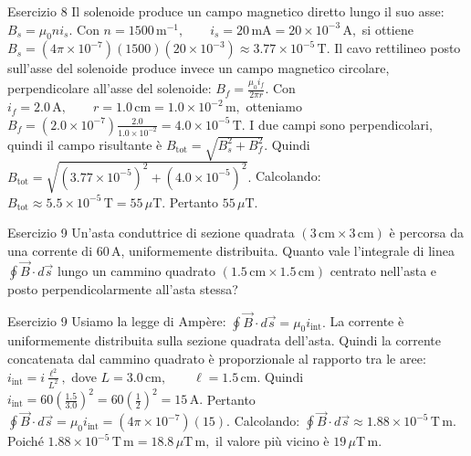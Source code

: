 \documentclass[a4paper]{article}
\begin{document}
\begin{snippetsolution}{Esercizio 8}
    Il solenoide produce un campo magnetico diretto lungo il suo asse:
    \(B_s = \mu_0 n i_s.\)
    Con
    \(n = 1500\,\mathrm{m^{-1}}, \qquad i_s = 20\,\mathrm{mA} = 20 \times 10^{-3}\,\mathrm{A},\)
    si ottiene
    \(B_s = \left(4\pi \times 10^{-7}\right) (1500) \left(20 \times 10^{-3}\right) \approx 3.77 \times 10^{-5}\,\mathrm{T}.\)
    Il cavo rettilineo posto sull'asse del solenoide produce invece un campo
    magnetico circolare, perpendicolare all'asse del solenoide:
    \(B_f = \frac{\mu_0 i_f}{2\pi r}.\)
    Con
    \(i_f = 2.0\,\mathrm{A}, \qquad r = 1.0\,\mathrm{cm} = 1.0 \times 10^{-2}\,\mathrm{m},\)
    otteniamo
    \(B_f = \left(2.0 \times 10^{-7}\right) \frac{2.0}{1.0 \times 10^{-2}} = 4.0 \times 10^{-5}\,\mathrm{T}.\)
    I due campi sono perpendicolari, quindi il campo risultante è
    \(B_{\mathrm{tot}} = \sqrt{B_s^2+B_f^2}.\)
    Quindi
    \(B_{\mathrm{tot}} = \sqrt{ \left(3.77 \times 10^{-5}\right)^2 + \left(4.0 \times 10^{-5}\right)^2 }.\)
    Calcolando:
    \(B_{\mathrm{tot}} \approx 5.5 \times 10^{-5}\,\mathrm{T} = 55\,\mu\mathrm{T}.\)
    Pertanto
    \(\boxed{55\,\mu\mathrm{T}}.\)
\end{snippetsolution}
\begin{snippetexercise}{Esercizio 9}
    Un'asta conduttrice di sezione quadrata
    \((3\,\mathrm{cm} \times 3\,\mathrm{cm})\) è percorsa da una corrente di
    \(60\,\mathrm{A}\), uniformemente distribuita. Quanto vale l'integrale di
    linea \(\oint \vec{B}\cdot d\vec{s}\) lungo un cammino quadrato
    \((1.5\,\mathrm{cm} \times 1.5\,\mathrm{cm})\) centrato nell'asta e posto
    perpendicolarmente all'asta stessa?

\end{snippetexercise}
\begin{snippetsolution}{Esercizio 9}
    Usiamo la legge di Ampère:
    \(\oint \vec{B}\cdot d\vec{s} = \mu_0 i_{\mathrm{int}}.\)
    La corrente è uniformemente distribuita sulla sezione quadrata dell'asta.
    Quindi la corrente concatenata dal cammino quadrato è proporzionale al
    rapporto tra le aree:
    \(i_{\mathrm{int}} = i \frac{\ell^2}{L^2},\)
    dove
    \(L = 3.0\,\mathrm{cm}, \qquad \ell = 1.5\,\mathrm{cm}.\)
    Quindi
    \(i_{\mathrm{int}} = 60 \left( \frac{1.5}{3.0} \right)^2 = 60 \left( \frac{1}{2} \right)^2 = 15\,\mathrm{A}.\)
    Pertanto
    \(\oint \vec{B}\cdot d\vec{s} = \mu_0 i_{\mathrm{int}} = \left(4\pi \times 10^{-7}\right)(15).\)
    Calcolando:
    \(\oint \vec{B}\cdot d\vec{s} \approx 1.88 \times 10^{-5}\,\mathrm{T\,m}.\)
    Poiché
    \(1.88 \times 10^{-5}\,\mathrm{T\,m} = 18.8\,\mu\mathrm{T\,m},\)
    il valore più vicino è
    \(\boxed{19\,\mu\mathrm{T\,m}}.\)
\end{snippetsolution}
\end{document}
